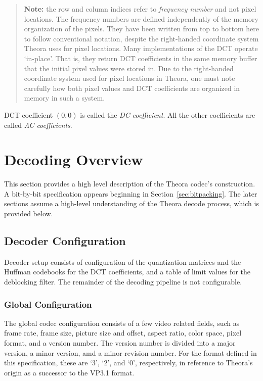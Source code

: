 \documentclass[9pt,letterpaper]{book}
\newcommand{\term}[1]{{\em #1}}
\numberwithin{equation}{chapter}
\numberwithin{figure}{chapter}
\numberwithin{table}{chapter}
\begin{document}
\begin{verse}
{\bf Note:} the row and column indices refer to {\em frequency number} and not
 pixel locations.
The frequency numbers are defined independently of the memory organization of
 the pixels.
They have been written from top to bottom here to follow conventional notation,
 despite the right-handed coordinate system Theora uses for pixel locations.
Many implementations of the DCT operate `in-place'.
That is, they return DCT coefficients in the same memory buffer that the
 initial pixel values were stored in.
Due to the right-handed coordinate system used for pixel locations in Theora,
 one must note carefully how both pixel values and DCT coefficients are
 organized in memory in such a system.
\end{verse}

DCT coefficient $(0,0)$ is called the \term{DC coefficient}.
All the other coefficients are called \term{AC coefficients}.


\chapter{Decoding Overview}

This section provides a high level description of the Theora codec's
 construction.
A bit-by-bit specification appears beginning in Section~\ref{sec:bitpacking}.
The later sections assume a high-level understanding of the Theora decode
 process, which is provided below.

\section{Decoder Configuration}

Decoder setup consists of configuration of the quantization matrices and the
 Huffman codebooks for the DCT coefficients, and a table of limit values for
 the deblocking filter.
The remainder of the decoding pipeline is not configurable.

\subsection{Global Configuration}

The global codec configuration consists of a few video related fields, such as
 frame rate, frame size, picture size and offset, aspect ratio, color space,
 pixel format, and a version number.
The version number is divided into a major version, a minor version, amd a
 minor revision number.
For the format defined in this specification, these are `3', `2', and
 `0', respectively, in reference to Theora's origin as a successor to the VP3.1
 format.
\end{document}

